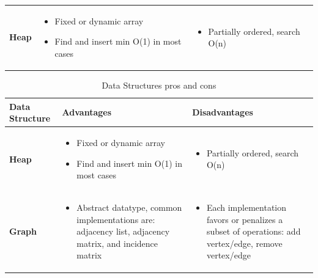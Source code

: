 \documentclass{article}
\begin{document}
\begin{table}[H]
\begin{tabulary}{1.0\textwidth}{L p{0.4\textwidth} p{0.4\textwidth}}
        
        \textbf{Heap} & \begin{itemize} \item{Fixed or dynamic array} \item{Find and insert min O(1) in most cases}  \end{itemize} & \begin{itemize} \item{Partially ordered, search O(n)} \end{itemize}\\
    

    \end{tabulary}
    \label{table:data_structs2}
\end{table}


\begin{table}[H]
	\small
	\centering
    \begin{tabulary}{1.0\textwidth}{L p{0.4\textwidth} p{0.4\textwidth}} %
        \textbf{Data  Structure} & \textbf{Advantages} & \textbf{Disadvantages} \\
        \hline
        
        \textbf{Heap} & \begin{itemize} \item{Fixed or dynamic array} \item{Find and insert min O(1) in most cases}  \end{itemize} & \begin{itemize} \item{Partially ordered, \newline search O(n)} \end{itemize}\\ 
        
        \textbf{Graph} & \begin{itemize} \item{Abstract datatype, common implementations are: adjacency list, adjacency matrix, and incidence matrix} \end{itemize} & \begin{itemize} \item{Each implementation favors or penalizes a subset of operations: add vertex/edge, remove vertex/edge} \end{itemize}\\
        
    \end{tabulary}
    \caption{Data Structures pros and cons}
    \label{my-label}
\end{table}
\end{document}

